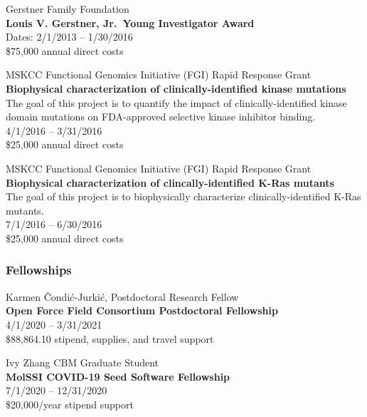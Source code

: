 \documentclass[10pt]{article}
\begin{document}
\vspace{1.5ex}

Gerstner Family Foundation \\
{\bf Louis V. Gerstner, Jr.~Young Investigator Award} \\
Dates: 2/1/2013 -- 1/30/2016 \\
\$75,000 annual direct costs

\vspace{1.5ex}

MSKCC Functional Genomics Initiative (FGI) Rapid Response Grant \\
{\bf Biophysical characterization of clinically-identified kinase mutations} \\
The goal of this project is to quantify the impact of clinically-identified kinase domain mutations on FDA-approved selective kinase inhibitor binding. \\
4/1/2016 -- 3/31/2016 \\
\$25,000 annual direct costs

\vspace{1.5ex}

MSKCC Functional Genomics Initiative (FGI) Rapid Response Grant \\
{\bf Biophysical characterization of clincally-identified K-Ras mutants} \\
The goal of this project is to biophysically characterize clinically-identified K-Ras mutants. \\
7/1/2016 -- 6/30/2016 \\
\$25,000 annual direct costs

\subsubsection*{Fellowships}

Karmen \v{C}ondi\'{c}-Jurki\'{c}, Postdoctoral Research Fellow\\
{\bf Open Force Field Consortium Postdoctoral Fellowship}\\
4/1/2020 -- 3/31/2021\\
\$88,864.10 stipend, supplies, and travel support

\vspace{1.5ex}

Ivy Zhang CBM Graduate Student\\
{\bf MolSSI COVID-19 Seed Software Fellowship}\\
7/1/2020 -- 12/31/2020\\
\$20,000/year stipend support
\end{document}
